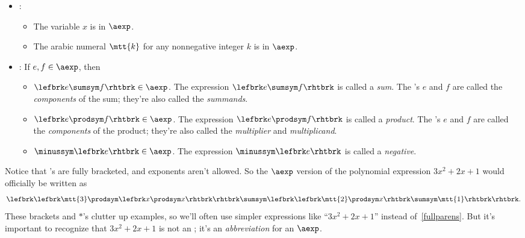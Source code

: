 \begin{definition} \mbox{}

\begin{itemize}
\item {}: \mbox{}

\begin{itemize}

\item The variable $x$ is in $\aexp$.

\item The arabic numeral $\mtt{k}$ for any nonnegative integer $k$ is
  in $\aexp$.

\end{itemize}

\item {}: If $e,f \in \aexp$, then
\begin{itemize}
\setcounter{enumi}{2}

\item $\lefbrk e \sumsym f \rhtbrk \in \aexp$.  The expression $\lefbrk e \sumsym
  f \rhtbrk$ is called a \emph{sum}.  The \aexp's $e$ and $f$ are called the
  \emph{components} of the sum; they're also called the \emph{summands}.

\item $\lefbrk e \prodsym f\rhtbrk \in \aexp$.  The expression $\lefbrk e \prodsym f\rhtbrk$ is called a
  \emph{product}.  The \aexp's $e$ and $f$ are called the
  \emph{components} of the product; they're also called the
  \emph{multiplier} and \emph{multiplicand}.

\item $\minussym\lefbrk e\rhtbrk \in \aexp$.  The expression $\minussym\lefbrk e\rhtbrk$ is called a
  \emph{negative}.
\end{itemize}
\end{itemize}
\end{definition}

Notice that \aexp's are fully bracketed, and exponents aren't allowed.  So
the $\aexp$ version of the polynomial expression $3x^2 + 2x + 1$ would
officially be written as
\begin{equation}\label{fullparens}
\lefbrk \lefbrk \mtt{3} \prodsym \lefbrk x \prodsym x\rhtbrk\rhtbrk \sumsym \lefbrk \lefbrk \mtt{2} \prodsym x\rhtbrk \sumsym \mtt{1}\rhtbrk\rhtbrk.
\end{equation}
These brackets and $\ast$'s clutter up examples, so we'll often use
simpler expressions like ``$3x^2 + 2x + 1$'' instead
of~\eqref{fullparens}.  But it's important to recognize that $3x^2 +
2x + 1$ is not an \aexp; it's an \emph{abbreviation} for an $\aexp$.

